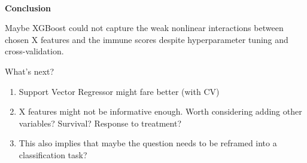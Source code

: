 \documentclass[
  letterpaper,
  DIV=11,
  numbers=noendperiod]{scrartcl}
\makeatletter
\let\oldparagraph\paragraph
\renewcommand{\paragraph}{
    \@ifstar
      \xxxParagraphStar
      \xxxParagraphNoStar
  }
\newcommand{\xxxParagraphStar}[1]{\oldparagraph*{#1}\mbox{}}
\newcommand{\xxxParagraphNoStar}[1]{\oldparagraph{#1}\mbox{}}
\providecommand{\tightlist}{%
  \setlength{\itemsep}{0pt}\setlength{\parskip}{0pt}}\usepackage{longtable,booktabs,array}
\makeatother
\begin{document}
\paragraph{\texorpdfstring{\textbf{Conclusion}}{Conclusion}}\label{conclusion}

Maybe XGBoost could not capture the weak nonlinear interactions between
chosen X features and the immune scores despite hyperparameter tuning
and cross-validation.

What's next?

\begin{enumerate}
\def\labelenumi{\arabic{enumi}.}
\tightlist
\item
  Support Vector Regressor might fare better (with CV)
\item
  X features might not be informative enough. Worth considering adding
  other variables? Survival? Response to treatment?
\item
  This also implies that maybe the question needs to be reframed into a
  classification task?
\end{enumerate}
\end{document}

